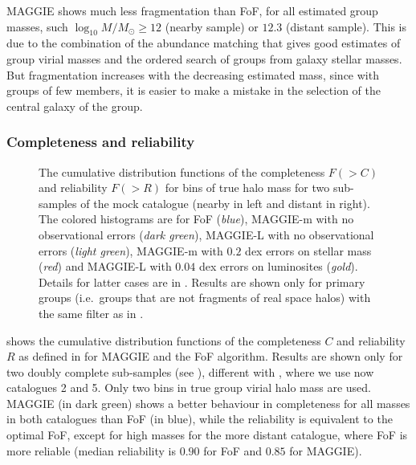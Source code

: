 MAGGIE shows much less fragmentation than FoF, for all estimated group masses,
such $\log_{10} M/M_\odot \geqslant 12$ (nearby sample) or $12.3$ (distant
sample). This is due to the combination of the
abundance matching that gives good estimates of group virial masses and the ordered
search of groups from galaxy stellar masses. But fragmentation increases
with the decreasing estimated mass, since with groups of few members, it
is easier to make a mistake in the selection of the central galaxy of the
group.

\subsubsection{Completeness and reliability}

\begin{figure}[t]
    \centering
    \begin{minipage}{0.49\linewidth}
    \end{minipage}
    \begin{minipage}{0.49\linewidth}
    \end{minipage}
    \caption{The cumulative distribution functions of the completeness $F(>C)$
        and reliability $F(>R)$ for bins of true halo mass for two sub-samples
        of the mock catalogue (nearby in left and distant in right). The
        colored histograms are for FoF (\emph{blue}), MAGGIE-m with no
        observational errors (\emph{dark green}), MAGGIE-L with no
        observational errors (\emph{light green}), MAGGIE-m with $0.2$ dex
        errors on stellar mass (\emph{red}) and MAGGIE-L with $0.04$ dex errors
        on luminosites (\emph{gold}). Details for
        latter cases are in . Results
        are shown only for primary groups (i.e.\ groups that are not fragments
    of real space halos) with the same filter as in
.\label{fig:comp_rel}}
\end{figure}

 shows the cumulative distribution functions of the
completeness $C$ and reliability $R$ as defined in
 for MAGGIE and the FoF algorithm.
Results are shown only for two doubly complete sub-samples (see
), different with
, where we use now catalogues 2
and 5. Only two bins in true group virial halo mass are used. MAGGIE (in dark
green) shows a better behaviour in completeness for all masses in both
catalogues than FoF (in blue), while the reliability is equivalent to the
optimal FoF, except for high masses for the more distant catalogue, where FoF
is more reliable (median reliability is $0.90$ for FoF and $0.85$ for MAGGIE).


